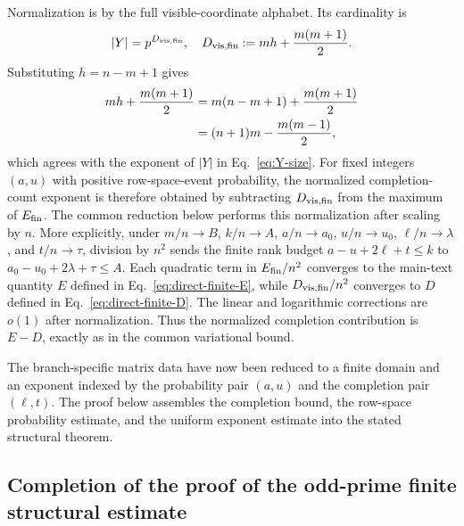 \documentclass[11pt]{article}
\newcommand{\1}{\mathbf 1}
\theoremstyle{plain}
\theoremstyle{definition}
\theoremstyle{remark}
\begin{document}
Normalization is by the full visible-coordinate alphabet.  Its cardinality is
\begin{equation}
 \lvert Y\rvert=p^{D_{\rm vis,fin}},
 \quad
 D_{\rm vis,fin}:=mh+\frac{m(m+1)}2.
 \label{eq:D-vis-fin}
\end{equation}
Substituting $h=n-m+1$ gives
\begin{align}
 mh+\frac{m(m+1)}2
 &=m(n-m+1)+\frac{m(m+1)}2\notag\\
 &=(n+1)m-\frac{m(m-1)}2,
 \label{eq:visible-dimension-finite-algebra}
\end{align}
which agrees with the exponent of $\lvert Y\rvert$ in Eq.~\eqref{eq:Y-size}.  For fixed integers $(a,u)$ with positive row-space-event probability, the normalized completion-count exponent is therefore obtained by subtracting $D_{\rm vis,fin}$ from the maximum of $E_{\rm fin}$.  The common reduction below performs this normalization after scaling by $n$.
More explicitly, under $m/n\to B$, $k/n\to A$,
$a/n\to a_0$, $u/n\to u_0$, $\ell/n\to\lambda$, and
$t/n\to\tau$, division by $n^2$ sends the finite rank budget
$a-u+2\ell+t\le k$ to
$a_0-u_0+2\lambda+\tau\le A$.  Each quadratic term in $E_{\rm fin}/n^2$ converges to the main-text
quantity $E$ defined in Eq.~\eqref{eq:direct-finite-E}, while
$D_{\rm vis,fin}/n^2$ converges to $D$ defined in
Eq.~\eqref{eq:direct-finite-D}.  The linear and logarithmic corrections are
$o(1)$ after normalization.  Thus the normalized completion contribution is
$E-D$, exactly as in the common variational bound.




The branch-specific matrix data have now been reduced to a finite domain and
an exponent indexed by the probability pair $(a,u)$ and the completion pair
$(\ell,t)$.  The proof below assembles the completion bound, the row-space
probability estimate, and the uniform exponent estimate into the stated
structural theorem.

\subsection{Completion of the proof of the odd-prime finite structural estimate}
\end{document}
